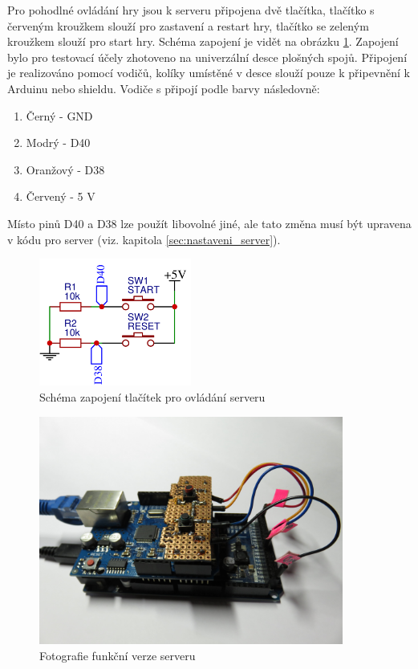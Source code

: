 \documentclass[a4paper,12pt, twoside]{article} %
\begin{document}
Pro pohodlné ovládání hry jsou k serveru připojena dvě tlačítka, tlačítko s červeným kroužkem slouží pro zastavení a restart hry, tlačítko se zeleným kroužkem slouží pro start hry. Schéma zapojení je vidět na obrázku \ref{fig:server_switch_module}. Zapojení bylo pro testovací účely zhotoveno na univerzální desce plošných spojů. Připojení je realizováno pomocí vodičů, kolíky umístěné v desce slouží pouze k připevnění k Arduinu nebo shieldu. Vodiče s připojí podle barvy následovně: 
\begin{enumerate}
\item Černý - GND
\item Modrý - D40
\item Oranžový - D38
\item Červený - 5 V
\end{enumerate}
Místo pinů D40 a D38 lze použít libovolné jiné, ale tato změna musí být upravena v kódu pro server (viz. kapitola \ref{sec:nastaveni_server}).
\begin{figure}[hbtp]
\centering
\includegraphics[width=5cm]{img/schema/server_switch_module.png}
\caption{\label{fig:server_switch_module}Schéma zapojení tlačítek pro ovládání serveru}
\end{figure}
\begin{figure}[hbtp]
\centering
\includegraphics[width=10cm]{img/foto/HW_server.jpg}
\caption{\label{fig:HW_server}Fotografie funkční verze serveru}
\end{figure}
\end{document}
